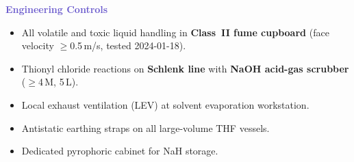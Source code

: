 \begin{minipage}[t]{0.48\linewidth}
  \begin{tcolorbox}[
    colback=SlateBlue!8, colframe=SlateBlue, boxrule=1pt,
    arc=4pt, left=8pt, right=8pt, top=6pt, bottom=6pt
  ]
    \textbf{\textcolor{SlateBlue}{\faCog\quad Engineering Controls}}

    \vspace{4pt}
    \begin{itemize}[leftmargin=*, itemsep=2pt, topsep=2pt]
      \item All volatile and toxic liquid handling in \textbf{Class~II fume
            cupboard} (face velocity $\geq$0.5\,m/s, tested 2024-01-18).
      \item Thionyl chloride reactions on \textbf{Schlenk line} with
            \textbf{NaOH acid-gas scrubber} ($\geq$4\,M, 5\,L).
      \item Local exhaust ventilation (LEV) at solvent evaporation workstation.
      \item Antistatic earthing straps on all large-volume THF vessels.
      \item Dedicated pyrophoric cabinet for NaH storage.
    \end{itemize}
  \end{tcolorbox}
\end{minipage}

\par
\vspace{6pt}

